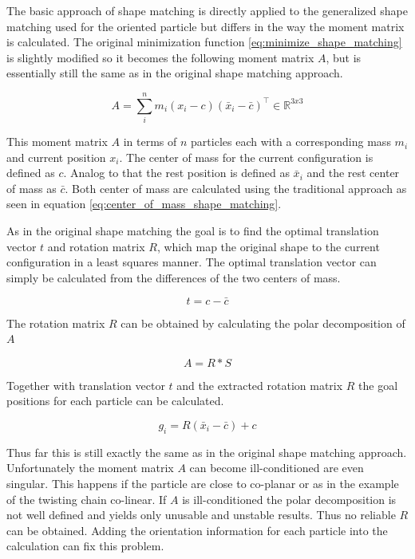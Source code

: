 The basic approach of shape matching is directly applied to the generalized shape matching used for the oriented particle but differs in the way the moment matrix is calculated. The original minimization function \ref{eq:minimize_shape_matching} is slightly modified so it becomes the following moment matrix $A$, but is essentially still the same as in the original shape matching approach.

\begin{equation}
A = \sum\limits_i^n m_i(x_i-c)(\bar{x}_i - \bar{c})^\top  \in \mathbb{R}^{3x3}
\label{eq:minimize_oriented_particle}
\end{equation}

This moment matrix $A$ in terms of $n$ particles each with a corresponding mass $m_i$ and current position $x_i$. The center of mass for the current configuration is defined as $c$. Analog to that the rest position is defined as $\bar{x}_i$ and the rest center of mass as $\bar{c}$. Both center of mass are calculated using the traditional approach as seen in equation \ref{eq:center_of_mass_shape_matching}.

As in the original shape matching the goal is to find the optimal translation vector $t$ and rotation matrix $R$, which map the original shape to the current configuration in a least squares manner. The optimal translation vector can simply be calculated from the differences of the two centers of mass.

\begin{equation}
t = c - \bar{c}
\end{equation}

The rotation matrix $R$ can be obtained by calculating the polar decomposition of $A$

\begin{equation}
A = R*S
\end{equation}

Together with translation vector $t$ and the extracted rotation matrix $R$ the goal positions for each particle can be calculated.

\begin{equation}
g_i = R(\bar{x}_i-\bar{c})+c
\end{equation}

Thus far this is still exactly the same as in the original shape matching approach. Unfortunately  the moment matrix $A$ can become ill-conditioned are even singular. This happens if the particle are close to co-planar or as in the example of the twisting chain co-linear. If $A$ is ill-conditioned the polar decomposition is not well defined and yields only unusable and unstable results. Thus no reliable $R$ can be obtained. Adding the orientation information for each particle into the calculation can fix this problem.

